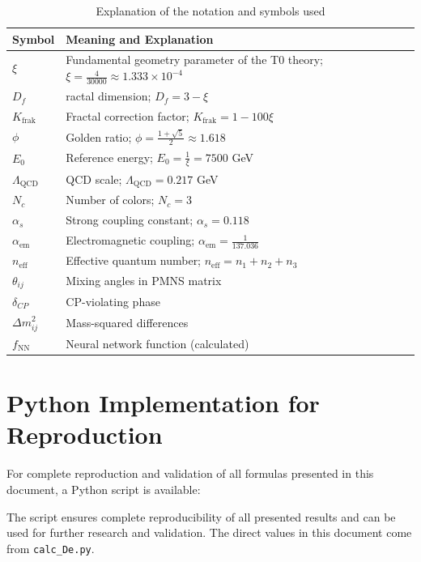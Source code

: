 	\begin{table}[h]
		\centering
		\begin{tabular}{p{2cm}p{12cm}}
			\toprule
			\textbf{Symbol} & \textbf{Meaning and Explanation} \\
			\midrule
			$\xi$ & Fundamental geometry parameter of the T0 theory; $\xi = \frac{4}{30000} \approx 1.333 \times 10^{-4}$ \\
			$D_f$ & ractal dimension; $D_f = 3 - \xi$ \\
			$K_{\text{frak}}$ & Fractal correction factor; $K_{\text{frak}} = 1 - 100\xi$ \\
			$\phi$ & Golden ratio; $\phi = \frac{1 + \sqrt{5}}{2} \approx 1.618$ \\
			$E_0$ & Reference energy; $E_0 = \frac{1}{\xi} = 7500$ GeV \\
			$\Lambda_{\text{QCD}}$ & QCD scale; $\Lambda_{\text{QCD}} = 0.217$ GeV \\
			$N_c$ & Number of colors; $N_c = 3$ \\
			$\alpha_s$ & Strong coupling constant; $\alpha_s = 0.118$ \\
			$\alpha_{\text{em}}$ & Electromagnetic coupling; $\alpha_{\text{em}} = \frac{1}{137.036}$ \\
			$n_{\text{eff}}$ & Effective quantum number; $n_{\text{eff}} = n_1 + n_2 + n_3$ \\
			$\theta_{ij}$ & Mixing angles in PMNS matrix \\
			$\delta_{CP}$ & CP-violating phase \\
			$\Delta m^2_{ij}$ & Mass-squared differences \\
			$f_{\text{NN}}$ & Neural network function (calculated) \\
			\bottomrule
		\end{tabular}
		\caption{Explanation of the notation and symbols used}
		\label{tab:symbols}
	\end{table}
	\section{Python Implementation for Reproduction}
	\label{app:python_reproduction}
	
	For complete reproduction and validation of all formulas presented in this document, a Python script is available:

	The script ensures complete reproducibility of all presented results and can be used for further research and validation. The direct values in this document come from \texttt{calc\_De.py}.
	
